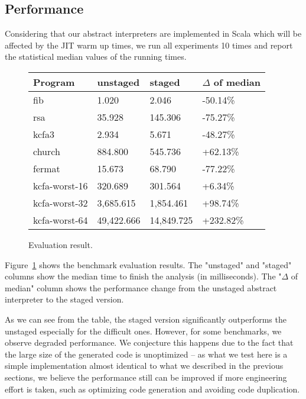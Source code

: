 \subsection{Performance}

Considering that our abstract interpreters are implemented in Scala which will be 
affected by the JIT warm up times, we run all experiments 10 times and report
the statistical median values of the running times.

\begin{figure}[h]
\begin{tabular}{@{}llll@{}}
\toprule
    Program            & unstaged   & staged     & $\Delta$ of median \\ \midrule
    fib                & 1.020      & 2.046      & -50.14\%          \\
    rsa                & 35.928     & 145.306    & -75.27\%          \\
    kcfa3              & 2.934      & 5.671      & -48.27\%          \\
    church             & 884.800    & 545.736    & +62.13\%          \\
    fermat             & 15.673     & 68.790     & -77.22\%          \\
    kcfa-worst-16      & 320.689    & 301.564    & +6.34\%           \\
    kcfa-worst-32      & 3,685.615  & 1,854.461  & +98.74\%          \\
    kcfa-worst-64      & 49,422.666 & 14,849.725 & +232.82\%         \\
    \bottomrule
\end{tabular}
\caption{Evaluation result.} \label{evaluation_result}
\end{figure}

Figure~\ref{evaluation_result} shows the benchmark evaluation results. The
"unstaged" and "staged" columns show the median time to finish the analysis (in
milliseconds). The "$\Delta$ of median" column shows the performance change from
the unstaged abstract interpreter to the staged version.

As we can see from the table, the staged version significantly outperforms the
unstaged especially for the difficult ones. However, for some benchmarks, we
observe degraded performance. We conjecture this happens due to the fact that
the large size of the generated code is unoptimized -- as what we test here is a
simple implementation almost identical to what we described in the previous
sections, we believe the performance still can be improved if more engineering
effort is taken, such as optimizing code generation and avoiding code
duplication.

